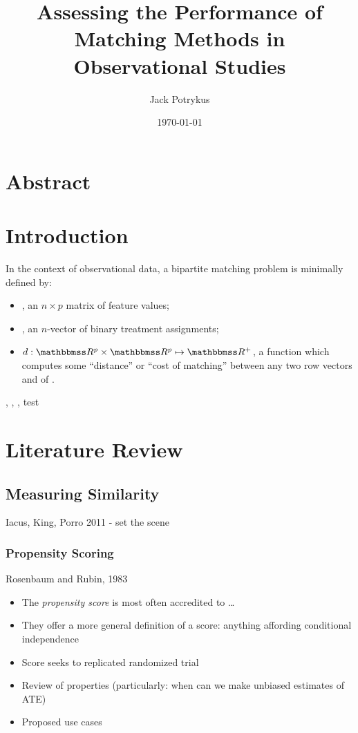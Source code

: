 \documentclass[11pt]{extarticle}
\title{Assessing the Performance of Matching Methods in Observational Studies}
\author{Jack Potrykus}
\date{\today}
\begin{document}
\maketitle{}

\section*{Abstract}
\tableofcontents{}
\newpage{}


\section{Introduction}
\label{sec:Introduction}

In the context of observational data, a bipartite matching problem is minimally defined by:
\begin{itemize}
  \item {}, an $n \times p$ matrix of feature values;
  \item {}, an $n$-vector of binary treatment assignments;
  \item $d : \reals^p \times \reals^p \mapsto \reals^+$, a function which computes some ``distance'' or ``cost of matching'' between any two row vectors  and  of .
\end{itemize}

, , , \vec{\upbeta}
test \cite{iacus_multivariate_2011}


\section{Literature Review}

\subsection{Measuring Similarity}
Iacus, King, Porro 2011 - set the scene

\subsubsection{Propensity Scoring}


Rosenbaum and Rubin, 1983
\begin{itemize}
  \item The \emph{propensity score} is most often accredited to \ldots
  \item They offer a more general definition of a score: anything affording conditional independence
  \item Score seeks to replicated randomized trial
  \item Review of properties (particularly: when can we make unbiased estimates of ATE)
  \item Proposed use cases
\end{itemize}
\end{document}
